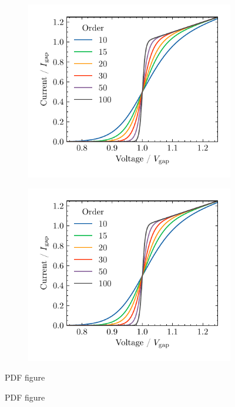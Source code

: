 \documentclass[11pt]{amsart}
\begin{document}
\begin{figure}[h!]
    \centering
    \begin{subfigure}[b]{0.49\textwidth}
    	\centering
        \includegraphics[width=\textwidth]{../figures/fig2.pdf}
        \caption{}
    \end{subfigure}\hfill
%
    \begin{subfigure}[b]{0.49\textwidth}
    	\centering
        \includegraphics[width=\textwidth]{../figures/fig2.pdf}
        \caption{}
    \end{subfigure}
\caption{PDF figure}
\end{figure}

\begin{figure}[h!]
    \centering
    \begin{subfigure}[b]{0.49\textwidth}
    	\centering
        
        \caption{}
    \end{subfigure}\hfill
%
    \begin{subfigure}[b]{0.49\textwidth}
    	\centering
        
        \caption{}
    \end{subfigure}
\caption{PDF figure}
\end{figure}
\end{document}
